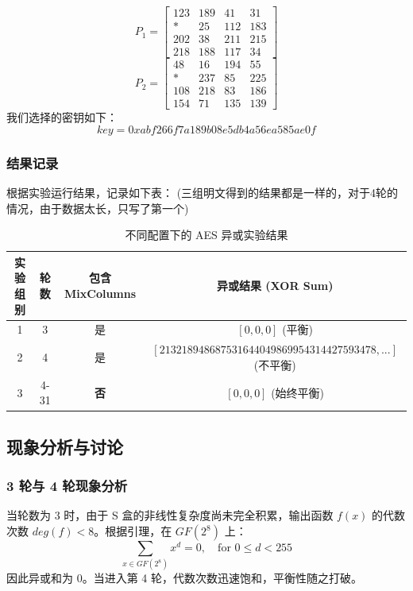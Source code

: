 \documentclass[12pt,a4paper]{article}
\begin{document}
\[
P_1 = \begin{bmatrix}
123 & 189 & 41 & 31 \\
* & 25 & 112 & 183 \\
202 & 38 & 211 & 215 \\
218 & 188 & 117 & 34
\end{bmatrix}
\]
\[
P_2 = \begin{bmatrix}
48 & 16 & 194 & 55 \\
* & 237 & 85 & 225 \\
108 & 218 & 83 & 186 \\
154 & 71 & 135 & 139
\end{bmatrix}
\]
我们选择的密钥如下：
\[
key = 0xabf266f7a189b08e5db4a56ea585ae0f
\]
\subsubsection{结果记录}
根据实验运行结果，记录如下表：
(三组明文得到的结果都是一样的，对于4轮的情况，由于数据太长，只写了第一个)
\begin{table}[h]
    \centering
    \begin{tabular}{@{}cccc@{}}
        \toprule
        实验组别 & 轮数 & 包含 MixColumns & 异或结果 (XOR Sum) \\ \midrule
        1        & 3    & 是               & $[0, 0, 0]$ (平衡)         \\
        2        & 4    & 是               &$[213218948687531644049869954314427593478, ...]$ (不平衡) \\
        3        & 4-31 & \textbf{否}      & $[0, 0, 0]$ (始终平衡)     \\ \bottomrule
    \end{tabular}
    \caption{不同配置下的 AES 异或实验结果}
\end{table}

\subsection{现象分析与讨论}

\subsubsection{3 轮与 4 轮现象分析}
当轮数为 3 时，由于 S 盒的非线性复杂度尚未完全积累，输出函数 $f(x)$ 的代数次数 $deg(f) < 8$。根据引理，在 $GF(2^8)$ 上：
\begin{equation}
    \sum_{x \in GF(2^8)} x^d = 0, \quad \text{for } 0 \le d < 255
\end{equation}
因此异或和为 0。当进入第 4 轮，代数次数迅速饱和，平衡性随之打破。
\end{document}
